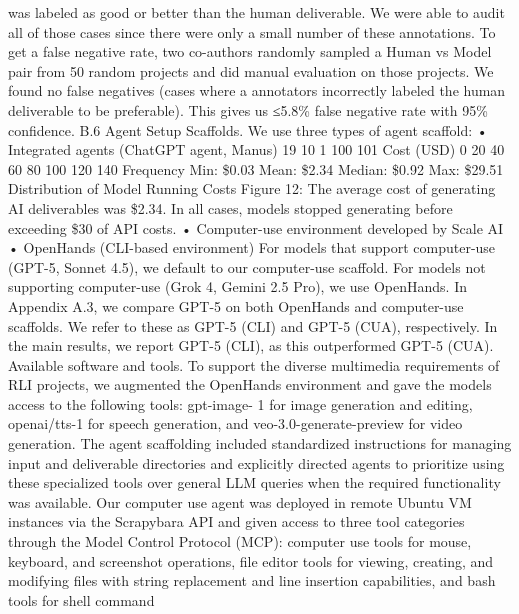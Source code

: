 was labeled as good or better than the human deliverable. We were able to audit all of those cases
since there were only a small number of these annotations.
To get a false negative rate, two co-authors randomly sampled a Human vs Model pair from 50
random projects and did manual evaluation on those projects. We found no false negatives (cases
where a annotators incorrectly labeled the human deliverable to be preferable). This gives us ≤5.8\%
false negative rate with 95\% confidence.
B.6
Agent Setup
Scaffolds.
We use three types of agent scaffold:
• Integrated agents (ChatGPT agent, Manus)
19
10
1
100
101
Cost (USD)
0
20
40
60
80
100
120
140
Frequency
Min: \$0.03
Mean: \$2.34
Median: \$0.92
Max: \$29.51
Distribution of Model Running Costs
Figure 12: The average cost of generating AI deliverables was \$2.34. In all cases, models stopped
generating before exceeding \$30 of API costs.
• Computer-use environment developed by Scale AI
• OpenHands (CLI-based environment)
For models that support computer-use (GPT-5, Sonnet 4.5), we default to our computer-use scaffold.
For models not supporting computer-use (Grok 4, Gemini 2.5 Pro), we use OpenHands.
In Appendix A.3, we compare GPT-5 on both OpenHands and computer-use scaffolds. We refer to
these as GPT-5 (CLI) and GPT-5 (CUA), respectively. In the main results, we report GPT-5 (CLI), as
this outperformed GPT-5 (CUA).
Available software and tools.
To support the diverse multimedia requirements of RLI projects, we
augmented the OpenHands environment and gave the models access to the following tools: gpt-image-
1 for image generation and editing, openai/tts-1 for speech generation, and veo-3.0-generate-preview
for video generation. The agent scaffolding included standardized instructions for managing input
and deliverable directories and explicitly directed agents to prioritize using these specialized tools
over general LLM queries when the required functionality was available.
Our computer use agent was deployed in remote Ubuntu VM instances via the Scrapybara API and
given access to three tool categories through the Model Control Protocol (MCP): computer use tools
for mouse, keyboard, and screenshot operations, file editor tools for viewing, creating, and modifying
files with string replacement and line insertion capabilities, and bash tools for shell command

